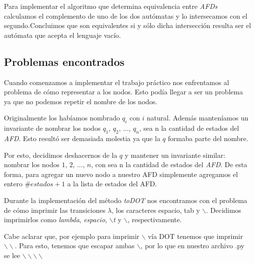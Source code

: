 Para implementar el algoritmo que determina equivalencia entre \emph{AFDs} calculamos el complemento de uno de los dos autómatas y lo intersecamos con el segundo.Concluimos que son equivalentes si y sólo dicha intersección resulta ser el autómata que acepta el lenguaje vacío.


\subsection{Problemas encontrados}

Cuando comenzamos a implementar el trabajo práctico nos enfrentamos al problema de cómo representar a los nodos. Esto podía llegar a ser un problema ya que no podemos repetir el nombre de los nodos.

Originalmente los habíamos nombrado \emph{$q_i$} con $i$ natural. Además manteníamos un invariante de nombrar los nodos $q_1$, $q_2$, $\hdots$, $q_n$, sea n la cantidad de estados del \emph{AFD}. Esto resultó ser demasiada molestia ya que la $q$ formaba parte del nombre.

Por esto, decidimos deshacernos de la $q$ y mantener un invariante similar: nombrar los nodos $1$, $2$, $\hdots$, $n$, con sea n la cantidad de estados del \emph{AFD}. De esta forma, para agregar un nuevo nodo a nuestro AFD simplemente agregamos el entero $\#estados + 1$ a la lista de estados del AFD.


Durante la implementación del método \emph{toDOT} nos encontramos con el problema de cómo imprimir las transiciones $\lambda$, los caracteres espacio, tab y $\backslash$. Decidimos imprimirlos como \emph{lambda}, \emph{espacio},  \emph{$\backslash$t} y $\backslash$, respectivamente.

Cabe aclarar que, por ejemplo para imprimir $\backslash$ vía DOT tenemos que imprimir $\backslash\backslash$. Para esto, tenemos que escapar ambas $\backslash$, por lo que en nuestro archivo .py se lee $\backslash\backslash\backslash\backslash$



